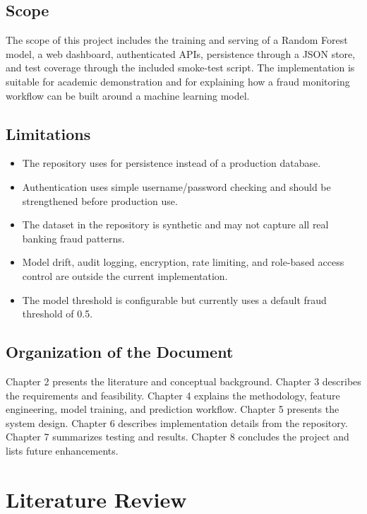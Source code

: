 \documentclass[12pt,a4paper]{report}
\begin{document}
\section{Scope}
The scope of this project includes the training and serving of a Random Forest model, a web dashboard, authenticated APIs, persistence through a JSON store, and test coverage through the included smoke-test script. The implementation is suitable for academic demonstration and for explaining how a fraud monitoring workflow can be built around a machine learning model.

\section{Limitations}
\begin{itemize}
    \item The repository uses  for persistence instead of a production database.
    \item Authentication uses simple username/password checking and should be strengthened before production use.
    \item The dataset in the repository is synthetic and may not capture all real banking fraud patterns.
    \item Model drift, audit logging, encryption, rate limiting, and role-based access control are outside the current implementation.
    \item The model threshold is configurable but currently uses a default fraud threshold of 0.5.
\end{itemize}

\section{Organization of the Document}
Chapter 2 presents the literature and conceptual background. Chapter 3 describes the requirements and feasibility. Chapter 4 explains the methodology, feature engineering, model training, and prediction workflow. Chapter 5 presents the system design. Chapter 6 describes implementation details from the repository. Chapter 7 summarizes testing and results. Chapter 8 concludes the project and lists future enhancements.

\chapter{Literature Review}
\end{document}
